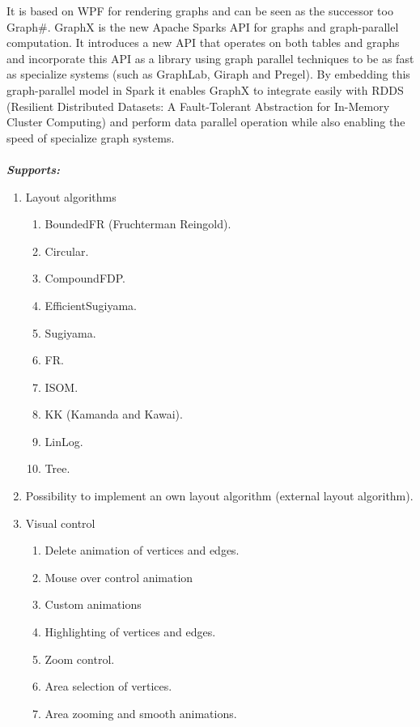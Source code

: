 \documentclass[a4paper,11pt]{kth-mag}
\begin{document}
\begin{appendices}
It is based on WPF for rendering graphs and can be seen as the successor too Graph\#. GraphX is the new Apache Sparks API for graphs and 
graph-parallel computation. It introduces a new API that operates on both tables and graphs and incorporate this API as a library using graph parallel techniques 
to be as fast as specialize systems (such as GraphLab, Giraph and Pregel). By embedding this graph-parallel model in Spark it enables GraphX to integrate easily with RDDS
(Resilient Distributed Datasets: A Fault-Tolerant Abstraction for In-Memory Cluster Computing) and perform data parallel operation while also enabling the speed of specialize graph systems\cite{website:graphxPG}.\\
\\
\textbf{\textit{Supports:\cite{website:graphx}}}\
\
\newline
\
\begin{enumerate}
	\item{Layout algorithms}
	\begin{enumerate}[label*=\arabic*.]
		\item{BoundedFR (Fruchterman Reingold).}
		\item{Circular.}
		\item{CompoundFDP.}
		\item{EfficientSugiyama.}
		\item{Sugiyama.}
		\item{FR.}
		\item{ISOM.}
		\item{KK (Kamanda and Kawai).}
		\item{LinLog.}
		\item{Tree.}
	\end{enumerate}
	\item{Possibility to implement an own layout algorithm (external layout algorithm).}
	\item{Visual control}
	\begin{enumerate}[label*=\arabic*.]
		\item{Delete animation of vertices and edges.}
		\item{Mouse over control animation}
		\item{Custom animations}
		\item{Highlighting of vertices and edges.}
		\item{Zoom control.}
		\item{Area selection of vertices.}
		\item{Area zooming and smooth animations.}
	\end{enumerate}

\end{enumerate}
\end{appendices}
\end{document}

